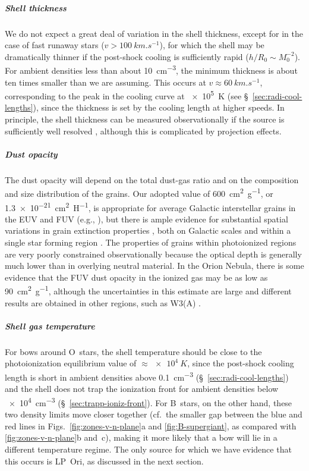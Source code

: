 \message{ !name(bs-bw-dw-03.tex)}\documentclass[useAMS, usenatbib, a4paper]{mnras}
\begin{document}
\subparagraph{Shell thickness}
We do not expect a great deal of variation in the shell thickness,
except for in the case of fast runaway stars
(\(v > \SI{100}{km.s^{-1}}\)), for which the shell may be dramatically
thinner if the post-shock cooling is sufficiently rapid
(\(h / R_0 \sim M_0^{-2}\)).  For ambient densities less than about
\SI{10}{cm^{-3}}, the minimum thickness is about ten times smaller
than we are assuming.  This occurs at
\(v \approx \SI{60}{km.s^{-1}}\), corresponding to the peak in the
cooling curve at \SI{e5}{K} (see \S~\ref{sec:radi-cool-lengths}),
since the thickness is set by the cooling length at higher speeds.  In
principle, the shell thickness can be measured observationally if the
source is sufficiently well resolved \citep{Kobulnicky:2017a},
although this is complicated by projection effects.

\subparagraph{Dust opacity}
The dust opacity will depend on the total dust-gas ratio and on the
composition and size distribution of the grains.  Our adopted value of
\SI{600}{cm^2.g^{-1}}, or \SI{1.3e-21}{cm^2.H^{-1}}, is appropriate
for average Galactic interstellar grains in the EUV and FUV (e.g.,
\citealp{Weingartner:2001a}), but there is ample evidence for
substantial spatial variations in grain extinction properties
\citep{Fitzpatrick:2007a}, both on Galactic scales
\citep{Schlafly:2016a} and within a single star forming region
\citep{Beitia-Antero:2017a}.  The properties of grains within
photoionized regions are very poorly constrained observationally
because the optical depth is generally much lower than in overlying
neutral material.  In the Orion Nebula, there is some evidence
\citep{Salgado:2016a} that the FUV dust opacity in the ionized gas may
be as low as \SI{90}{cm^2.g^{-1}}, although the uncertainties in this
estimate are large and different results are obtained in other
regions, such as W3(A) \citep{Salgado:2012a}.   

\subparagraph{Shell gas temperature} For bows around O~stars, the
shell temperature should be close to the photoionization equilibrium
value of \(\approx \SI{e4}{K}\), since the post-shock cooling length
is short in ambient densities above \SI{0.1}{cm^{-3}}
(\S~\ref{sec:radi-cool-lengths}) and the shell does not trap the
ionization front for ambient densities below \SI{e4}{cm^{-3}}
(\S~\ref{sec:trapp-ioniz-front}).  For B~stars, on the other hand,
these two density limits move closer together (cf.~the smaller gap
between the blue and red lines in Figs.~\ref{fig:zones-v-n-plane}a and
\ref{fig:B-supergiant}, as compared with \ref{fig:zones-v-n-plane}b
and~c), making it more likely that a bow will lie in a different
temperature regime.  The only source for which we have evidence that
this occurs is LP~Ori, as discussed in the next section.
\end{document}
